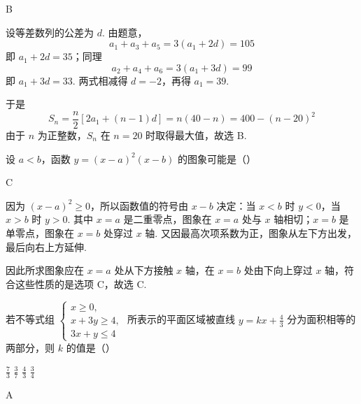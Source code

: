 \begin{answer}
B
\end{answer}

\begin{solution}
设等差数列的公差为 \(d\). 由题意，
\[
a_1+a_3+a_5=3(a_1+2d)=105
\]
即 \(a_1+2d=35\)；同理
\[
a_2+a_4+a_6=3(a_1+3d)=99
\]
即 \(a_1+3d=33\). 两式相减得 \(d=-2\)，再得 \(a_1=39\).

于是
\[
S_n=\frac{n}{2}\left[2a_1+(n-1)d\right]=n(40-n)=400-(n-20)^2
\]
由于 \(n\) 为正整数，\(S_n\) 在 \(n=20\) 时取得最大值，故选 B.
\end{solution}

\begin{problem}
设 \(a < b\)，函数 \(y = (x - a)^2(x - b)\) 的图象可能是（\quad）

    {}
    {}
    {}
\end{problem}

\begin{answer}
C
\end{answer}

\begin{solution}
因为 \((x-a)^2\geqslant0\)，所以函数值的符号由 \(x-b\) 决定：当 \(x<b\) 时 \(y<0\)，当 \(x>b\) 时 \(y>0\). 其中 \(x=a\) 是二重零点，图象在 \(x=a\) 处与 \(x\) 轴相切；\(x=b\) 是单零点，图象在 \(x=b\) 处穿过 \(x\) 轴. 又因最高次项系数为正，图象从左下方出发，最后向右上方延伸.

因此所求图象应在 \(x=a\) 处从下方接触 \(x\) 轴，在 \(x=b\) 处由下向上穿过 \(x\) 轴，符合这些性质的是选项 C，故选 C.
\end{solution}

\begin{problem}
若不等式组 \(\begin{cases}
x \geqslant 0,\\
x + 3y \geqslant 4,\\
3x + y \leqslant 4
\end{cases}\) 所表示的平面区域被直线 \(y = kx + \frac{4}{3}\) 分为面积相等的两部分，则 \(k\) 的值是（\quad）

\choices
    {\(\frac{7}{3}\)}
    {\(\frac{3}{7}\)}
    {\(\frac{4}{3}\)}
    {\(\frac{3}{4}\)}
\end{problem}

\begin{answer}
A
\end{answer}


